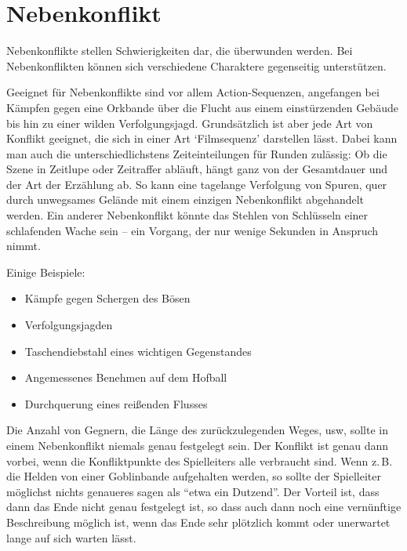 \section{Nebenkonflikt}\label{Sec:Nebenkonflikt}
Nebenkonflikte stellen Schwierigkeiten dar, die überwunden werden. Bei Nebenkonflikten können sich verschiedene Charaktere gegenseitig unterstützen.

Geeignet für Nebenkonflikte sind vor allem Action-Sequenzen, angefangen bei Kämpfen gegen eine Orkbande über die Flucht aus einem einstürzenden Gebäude bis hin zu einer wilden Verfolgungsjagd. Grundsätzlich ist aber jede Art von Konflikt geeignet, die sich in einer Art `Filmsequenz' darstellen lässt. Dabei kann man auch die unterschiedlichstens Zeiteinteilungen für Runden zulässig: Ob die Szene in Zeitlupe oder Zeitraffer abläuft, hängt ganz von der Gesamtdauer und der Art der Erzählung ab. So kann eine tagelange Verfolgung von Spuren, quer durch unwegsames Gelände mit einem einzigen Nebenkonflikt abgehandelt werden. Ein anderer Nebenkonflikt könnte das Stehlen von Schlüsseln einer schlafenden Wache sein -- ein Vorgang, der nur wenige Sekunden in Anspruch nimmt.

\begin{beispiel}
Einige Beispiele:
\begin{itemize}
  \item Kämpfe gegen Schergen des Bösen
  \item Verfolgungsjagden
  \item Taschendiebstahl eines wichtigen Gegenstandes
  \item Angemessenes Benehmen auf dem Hofball
  \item Durchquerung eines reißenden Flusses
\end{itemize}
\end{beispiel}

Die Anzahl von Gegnern, die Länge des zurückzulegenden Weges, usw, sollte in einem Nebenkonflikt niemals genau festgelegt sein. Der Konflikt ist genau dann vorbei, wenn die Konfliktpunkte des Spielleiters alle verbraucht sind. Wenn z.\,B. die Helden von einer Goblinbande aufgehalten werden, so sollte der Spielleiter möglichst nichts genaueres sagen als ``etwa ein Dutzend''. Der Vorteil ist, dass dann das Ende nicht genau festgelegt ist, so dass auch dann noch eine vernünftige Beschreibung möglich ist, wenn das Ende sehr plötzlich kommt oder unerwartet lange auf sich warten lässt.

